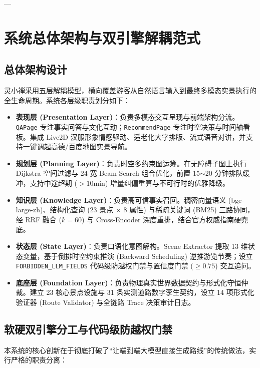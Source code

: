\documentclass[11pt,a4paper]{ctexart}
\begin{document}
---

\section{系统总体架构与双引擎解耦范式}

\subsection{总体架构设计}
灵小禅采用五层解耦模型，横向覆盖游客从自然语言输入到最终多模态实景执行的全生命周期。系统各层级职责划分如下：

\begin{itemize}[leftmargin=1.5em]
    \item \textbf{表现层 (Presentation Layer)}：负责多模态交互呈现与前端架构分流。\texttt{QAPage} 专注事实问答与文化互动；\texttt{RecommendPage} 专注时空决策与时间轴看板。集成 Live2D 汉服形象情感驱动、适老化大字排版、流式语音对讲，并支持一键调起高德/百度地图实景导航。
    \item \textbf{规划层 (Planning Layer)}：负责时空多约束图运筹。在无障碍子图上执行 Dijkstra 空间过滤与 24 宽 Beam Search 组合优化，前置 15$\sim$20 分钟排队缓冲，支持中途超期 ($>10\text{min}$) 增量纠偏重算与不可行时的优雅降级。
    \item \textbf{知识层 (Knowledge Layer)}：负责高可信事实召回。稠密向量语义 (bge-large-zh)、结构化查询 (23 景点 $\times$ 8 属性) 与稀疏关键词 (BM25) 三路协同，经 RRF 融合 ($k=60$) 与 Cross-Encoder 深度重排，结合官方权威指南硬兜底。
    \item \textbf{状态层 (State Layer)}：负责口语化意图解构。Scene Extractor 提取 13 维状态变量，基于倒排时空约束推演 (Backward Scheduling) 逆推游览节奏；设立 \texttt{FORBIDDEN\_LLM\_FIELDS} 代码级防越权门禁与置信度门禁 ($\ge 0.75$) 交互追问。
    \item \textbf{底座层 (Foundation Layer)}：负责物理真实世界数据契约与形式化守恒仲裁。建立 23 核心景点设施与 31 条实测道路数字孪生契约，设立 14 项形式化验证器 (Route Validator) 与全链路 Trace 决策审计日志。
\end{itemize}

\subsection{软硬双引擎分工与代码级防越权门禁}
本系统的核心创新在于彻底打破了“让端到端大模型直接生成路线”的传统做法，实行严格的职责分离：
\end{document}
